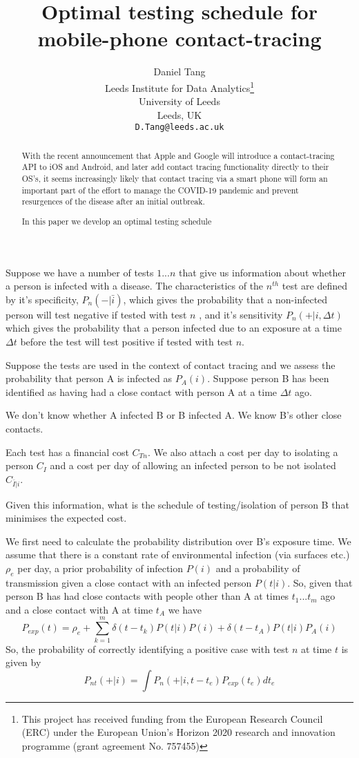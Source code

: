 \documentclass{article}
\title{Optimal testing schedule for mobile-phone contact-tracing}
\author{
  Daniel Tang\\
  Leeds Institute for Data Analytics\thanks{This project has received funding from the European Research Council (ERC) under the European Union’s Horizon 2020 research and innovation programme (grant agreement No. 757455)}\\
  University of Leeds\\
  Leeds, UK\\
  \texttt{D.Tang@leeds.ac.uk} \\
}
\begin{document}
\maketitle

\begin{abstract}
With the recent announcement\cite{applegoogle} that Apple and Google will introduce a contact-tracing API to iOS and Android, and later add contact tracing functionality directly to their OS's, it seems increasingly likely that contact tracing via a smart phone will form an important part of the effort to manage the COVID-19 pandemic and prevent resurgences of the disease after an initial outbreak.

In this paper we develop an optimal testing schedule 
\end{abstract}


Suppose we have a number of tests $1...n$ that give us information about whether a person is infected with a disease. The characteristics of the $n^{th}$ test are defined by it's specificity, $P_n(-|\bar{i})$, which gives the probability that a non-infected person will test negative if tested with test $n$ , and it's sensitivity $P_n(+|i,\Delta t)$ which gives the probability that a person infected due to an exposure at a time $\Delta t$ before the test will test positive if tested with test $n$.

Suppose the tests are used in the context of contact tracing and we assess the probability that person A is infected as $P_A(i)$. Suppose person B has been identified as having had a close contact with person A at a time $\Delta t$ ago.

We don't know whether A infected B or B infected A. We know B's other close contacts.

Each test has a financial cost $C_{Tn}$. We also attach a cost per day to isolating a person $C_I$ and a cost per day of allowing an infected person to be not isolated $C_{\bar{I}|i}$.

Given this information, what is the schedule of testing/isolation of person B that minimises the expected cost.

We first need to calculate the probability distribution over B's exposure time. We assume that there is a constant rate of environmental infection (via surfaces etc.) $\rho_e$ per day, a prior probability of infection $P(i)$ and a probability of transmission given a close contact with an infected person $P(t|i)$. So, given that person B has had close contacts with people other than A at times $t_1...t_m$ ago and a close contact with A at time $t_A$ we have
\[
P_{exp}(t) = \rho_e + \sum_{k=1}^m \delta(t-t_k)P(t|i)P(i) + \delta(t-t_A)P(t|i)P_A(i)
\]
So, the probability of correctly identifying a positive case with test $n$ at time $t$ is given by
\[
P_{nt}(+|i) = \int P_n(+|i,t-t_e)P_{exp}(t_e) dt_e
\]

%

%
%
% 
%

\end{document}
